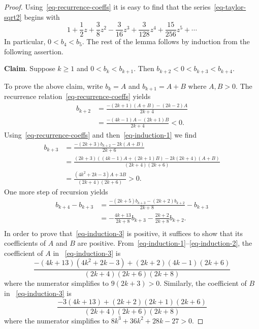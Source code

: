 \documentclass[12pt]{amsart}
\theoremstyle{definition}
\theoremstyle{remark}
\numberwithin{equation}{section}
\begin{document}
\begin{proof} Using~\eqref{eq-recurrence-coeffs} it is easy to find that the series~\eqref{eq-taylor-sqrt2} begins with 
\[1 + \frac{1}{2}z+\frac{3}{8}z^2 - \frac{3}{16}z^3 + \frac{3}{128}z^4 + \frac{15}{256}z^5 + \cdots \]
In particular, $0<b_4<b_5$. The rest of the lemma follows by induction from the following assertion. 

\textbf{Claim}. Suppose $k\ge 1$ and $0<b_k<b_{k+1}$. Then $b_{k+2}<0<b_{k+3}<b_{k+4}$. 

To prove the above claim, write $b_k=A$ and $b_{k+1}=A+B$ where $A, B>0$. The recurrence relation~\eqref{eq-recurrence-coeffs} yields  
\begin{equation}\label{eq-induction-1}
\begin{split}
b_{k+2} &= \frac{-(2k+1)(A+B) - (2k-2) A}{2k+4} \\ 
&= \frac{-(4k-1) A - (2k+1)B}{2k+4} < 0.
\end{split} 
\end{equation}
Using~\eqref{eq-recurrence-coeffs} and then~\eqref{eq-induction-1} we find
\begin{equation}\label{eq-induction-2}
\begin{split} 
b_{k+3} &= \frac{-(2k+3) b_{k+2} - 2k (A+B)}{2k+6}  \\
& = \frac{(2k+3)((4k-1) A + (2k+1)B) - 2k(2k+4)(A+B) }{(2k+4)(2k+6)}  \\
& = \frac{(4k^2 + 2k - 3)A + 3B}{(2k+4)(2k+6)} > 0.
\end{split} 
\end{equation}
One more step of recursion yields 
\begin{equation}\label{eq-induction-3}
\begin{split} 
b_{k+4} - b_{k+3} &= \frac{-(2k+5) b_{k+3} - (2k+2) b_{k+2}}{2k+8} - b_{k+3}  \\
& = -\frac{4k+13}{2k+8} b_{k+3} - \frac{2k+2}{2k+8} b_{k+2}. \\
\end{split} 
\end{equation}
In order to prove that~\eqref{eq-induction-3} is positive, it suffices to show that its coefficients of $A$ and $B$ are positive. From~\eqref{eq-induction-1}--\eqref{eq-induction-2}, the coefficient of $A$ in ~\eqref{eq-induction-3} is 
\[
\frac{-(4k+13)(4k^2 + 2k - 3) + (2k+2)(4k-1)(2k+6)}{(2k+4)(2k+6)(2k+8)} 
\]
where the numerator simplifies to $9(2k+3)>0$. Similarly, the coefficient of $B$ in ~\eqref{eq-induction-3} is 
\[
\frac{-3(4k+13) + (2k+2)(2k+1)(2k+6)}{(2k+4)(2k+6)(2k+8)} 
\]
where the numerator simplifies to $8k^3 + 36k^2 + 28k - 27 >0$. 
\end{proof}
\end{document}
